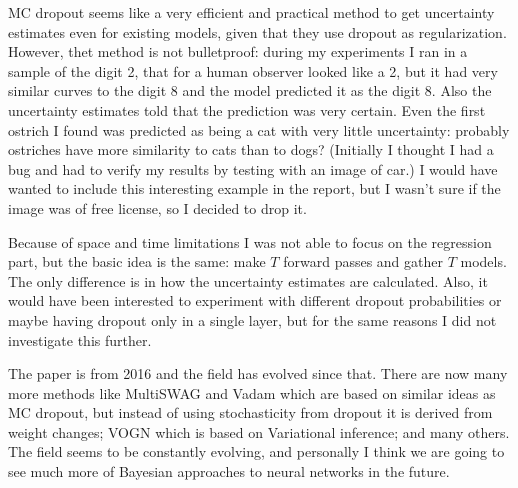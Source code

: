\documentclass[11pt]{article}
\begin{document}
MC dropout seems like a very efficient and practical method to get uncertainty estimates even for existing models, given that they use dropout as regularization. However, thet method is not bulletproof: during my experiments I ran in a sample of the digit 2, that for a human observer looked like a 2, but it had very similar curves to the digit 8 and the model predicted it as the digit 8. Also the uncertainty estimates told that the prediction was very certain. Even the first ostrich I found was predicted as being a cat with very little uncertainty: probably ostriches have more similarity to cats than to dogs? (Initially I thought I had a bug and had to verify my results by testing with an image of car.) I would have wanted to include this interesting example in the report, but I wasn't sure if the image was of free license, so I decided to drop it.

Because of space and time limitations I was not able to focus on the regression part, but the basic idea is the same: make $T$ forward passes and gather $T$ models. The only difference is in how the uncertainty estimates are calculated. Also, it would have been interested to experiment with different dropout probabilities or maybe having dropout only in a single layer, but for the same reasons I did not investigate this further.

The paper \cite{gal2016dropout} is from 2016 and the field has evolved since that. There are now many more methods like MultiSWAG \cite{wilson20} and Vadam \cite{khan18} which are based on similar ideas as MC dropout, but instead of using stochasticity from dropout it is derived from weight changes; VOGN \cite{osawa19} which is based on Variational inference; and many others. The field seems to be constantly evolving, and personally I think we are going to see much more of Bayesian approaches to neural networks in the future.



\end{document}
